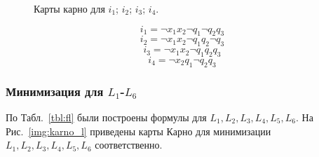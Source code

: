 \documentclass[a4paper, final]{article}
\begin{document}
\begin{figure}[H]
  \centering {}  
    \hspace{4ex}
    \hspace{4ex}
    \caption{Карты карно для  $i_1$;  $i_2$;  $i_3$;  $i_4$.
    }
    \label{img:karno_i}
  \end{figure}

\[i_1 = \neg x_1 x_2 \neg q_1 \neg q_2 q_3\]
\[i_2 = \neg x_1 x_2 \neg q_1 q_2 \neg q_3\]
\[i_3 = \neg x_1 x_2 \neg q_1 q_2 q_3\]
\[i_4 = \neg x_2 q_1 \neg q_2 q_3\]

\subsubsection{Минимизация для $L_1$-$L_6$}
По Табл.~\ref{tbl:fl} были построены формулы для $L_1, L_2, L_3, L_4, L_5, L_6$. На Рис.~\ref{img:karno_l} приведены карты Карно для минимизации $L_1, L_2, L_3, L_4, L_5, L_6$ соответственно.
\end{document}
